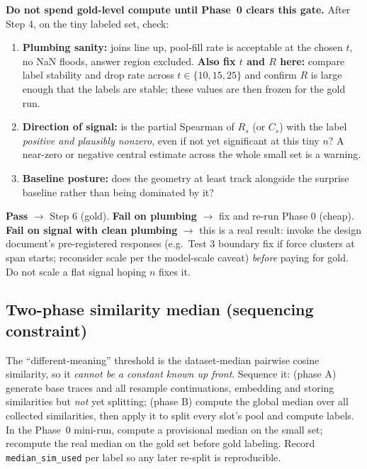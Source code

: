 \documentclass[11pt]{article}
\begin{document}
\begin{gatebox}
\textbf{Do not spend gold-level compute until Phase~0 clears this gate.} After Step 4, on the tiny labeled set, check:
\begin{enumerate}[leftmargin=1.7em]
  \item \textbf{Plumbing sanity:} joins line up, pool-fill rate is acceptable at the chosen $t$, no NaN floods, answer region excluded. \textbf{Also fix $t$ and $R$ here:} compare label stability and drop rate across $t\in\{10,15,25\}$ and confirm $R$ is large enough that the labels are stable; these values are then frozen for the gold run.
  \item \textbf{Direction of signal:} is the partial Spearman of $R_s$ (or $C_s$) with the label \emph{positive and plausibly nonzero}, even if not yet significant at this tiny $n$? A near-zero or negative central estimate across the whole small set is a warning.
  \item \textbf{Baseline posture:} does the geometry at least track alongside the surprise baseline rather than being dominated by it?
\end{enumerate}
\textbf{Pass} $\rightarrow$ Step 6 (gold). \textbf{Fail on plumbing} $\rightarrow$ fix and re-run Phase 0 (cheap). \textbf{Fail on signal with clean plumbing} $\rightarrow$ this is a real result: invoke the design document's pre-registered responses (e.g.\ Test 3 boundary fix if force clusters at span starts; reconsider scale per the model-scale caveat) \emph{before} paying for gold. Do not scale a flat signal hoping $n$ fixes it.
\end{gatebox}

\subsection{Two-phase similarity median (sequencing constraint)}
\label{sec:gate-seq}
The ``different-meaning'' threshold is the dataset-median pairwise cosine similarity, so it \emph{cannot be a constant known up front}. Sequence it: (phase A) generate base traces and all resample continuations, embedding and storing similarities but \emph{not} yet splitting; (phase B) compute the global median over all collected similarities, then apply it to split every slot's pool and compute labels. In the Phase~0 mini-run, compute a provisional median on the small set; recompute the real median on the gold set before gold labeling. Record \texttt{median\_sim\_used} per label so any later re-split is reproducible.
\end{document}
